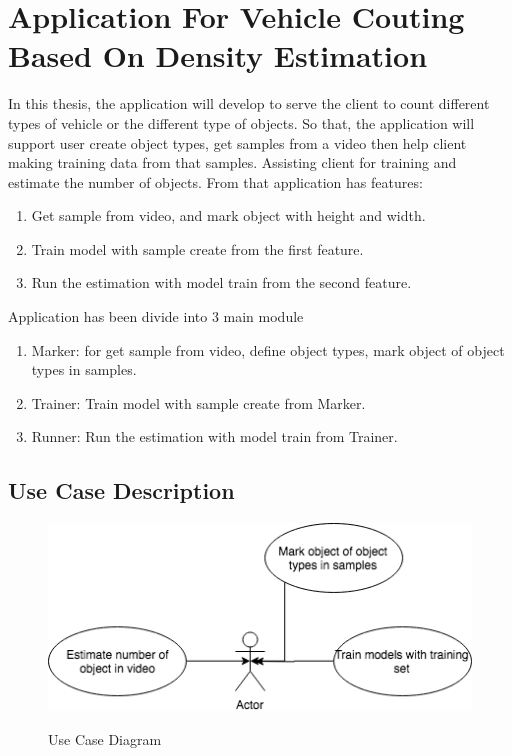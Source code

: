 \chapter{Application For Vehicle Couting Based On Density Estimation}

In this thesis, the application will develop to serve the client to count different types of vehicle or the different type of objects. So that, the application will support user create object types, get samples from a video then help client making training data from that samples. Assisting client for training and estimate the number of objects.
From that application has features:
\begin{enumerate}
  \item Get sample from video, and mark object with height and width.
  \item Train model with sample create from the first feature.
  \item Run the estimation with model train from the second feature.
\end{enumerate}
Application has been divide into  3 main module
\begin{enumerate}
  \item Marker: for get sample from video, define object types, mark object of object types in samples.
  \item Trainer: Train model with sample create from Marker.
  \item Runner: Run the estimation with model train from Trainer.
\end{enumerate}
\section{Use Case Description}
\begin{center}
  \begin{figure}[H]
    \includegraphics[width=\textwidth]{Chapters/Fig/usecase}
    \label{usecasediagram}
    \caption{Use Case Diagram}
  \end{figure}
\end{center}

